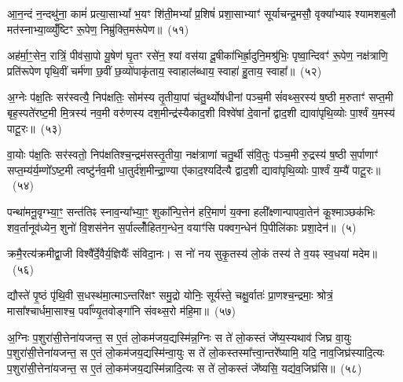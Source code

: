 आ॒न॒न्दं न॒न्दथु॑ना॒ कामं॑ प्रत्या॒सा\-भ्यां᳚ भ॒यꣳ शि॑ती॒म\-भ्यां᳚ प्र॒शिषं॑ प्रशा॒साभ्याꣳ॑ सूर्याचन्द्र॒मसौ॒ वृक्या᳚भ्याꣴ श्यामशब॒लौ मत॑स्नाभ्या॒व्व्युँ॑ष्टिꣳ रू॒पेण॒ निम्रु॑क्ति॒मरू॑पेण॥~(५१)

{\anuvakamend[{आ॒न॒न्दꣳ षोड॑श}]}%

अह॑र्मा॒ꣳ॒सेन॒ रात्रिं॒ पीव॑सा॒पो यू॒षेण॑ घृ॒तꣳ रसे॑न॒ श्यां वस॑या दू॒षीका॑भिर्\mbox{}ह्रा॒दुनि॒मश्रु॑भिः॒ पृष्वा॒न्दिवꣳ॑ रू॒पेण॒ नक्ष॑त्राणि॒ प्रति॑रूपेण पृथि॒वीं चर्म॑णा छ॒वीं छ॒व्यो॑पाकृ॑ताय॒ स्वाहाल॑ब्धाय॒ स्वाहा॑ हु॒ताय॒ स्वाहा᳚॥~(५२)

{\anuvakamend[{अह॑र॒ष्टाविꣳ॑शतिः}]}%

अ॒ग्नेः प॑क्ष॒तिः सर॑स्वत्यै॒ निप॑क्षतिः॒ सोम॑स्य तृ॒तीया॒पां च॑तु॒र्थ्योष॑धीनां पञ्च॒मी सं॑वथ्स॒रस्य॑ ष॒ष्ठी म॒रुताꣳ॑ सप्त॒मी बृह॒स्पते॑रष्ट॒मी मि॒त्रस्य॑ नव॒मी वरु॑णस्य दश॒मीन्द्र॑स्यैकाद॒शी विश्वे॑षां दे॒वानां᳚ द्वाद॒शी द्यावा॑पृथि॒व्योः पा॒र्श्वं य॒मस्य॑ पाटू॒रः॥~(५३)

{\anuvakamend[{अ॒ग्नेरेका॒न्नत्रि॒ꣳ॒शत्}]}%

वा॒योः प॑क्ष॒तिः सर॑स्वतो॒ निप॑क्षतिश्च॒न्द्रम॑सस्तृ॒तीया॒ नक्ष॑त्राणां चतु॒र्थी स॑वि॒तुः प॑ञ्च॒मी रु॒द्रस्य॑ ष॒ष्ठी स॒र्पाणाꣳ॑ सप्त॒म्य॑र्य॒म्णो᳚\-ऽष्ट॒मी त्वष्टु॑र्नव॒मी धा॒तुर्द॑श॒मीन्द्रा॒ण्या ए॑काद॒श्यदि॑त्यै द्वाद॒शी द्यावा॑पृथि॒व्योः पा॒र्श्वं य॒म्यै॑ पाटू॒रः॥~(५४)

{\anuvakamend[{वा॒योर॒ष्टाविꣳ॑शतिः}]}%

पन्था॑मनू॒वृग्भ्या॒ꣳ॒ सन्त॑तिꣴ स्नाव॒न्या᳚भ्या॒ꣳ॒ शुका᳚न्पि॒त्तेन॑ हरि॒माणं॑ य॒क्ना हली᳚क्ष्णान्पापवा॒तेन॑ कू॒श्माञ्छक॑भिः शव॒र्तानूव॑ध्येन॒ शुनो॑ वि॒शस॑नेन स॒र्पाल्लोँ॑हितग॒न्धेन॒ वयाꣳ॑सि पक्वग॒न्धेन॑ पि॒पीलि॑काः प्रशा॒देन॑॥~(५)

{\anuvakamend[{पन्था॒न्द्वाविꣳ॑शतिः}]}%

क्रमै॒रत्य॑क्रमीद्वा॒जी विश्वै᳚र्दे॒वैर्य॒ज्ञियैः᳚ संविदा॒नः। स नो॑ नय सुकृ॒तस्य॑ लो॒कं तस्य॑ ते व॒यꣴ स्व॒धया॑ मदेम॥~(५६)

{\anuvakamend[{क्रमै॑र॒ष्टाद॑श}]}%

द्यौस्ते॑ पृ॒ष्ठं पृ॑थि॒वी स॒धस्थ॑मा॒त्माऽन्तरि॑क्षꣳ समु॒द्रो योनिः॒ सूर्य॑स्ते॒ चक्षु॒र्वातः॑ प्रा॒णश्च॒न्द्रमाः॒ श्रोत्रं॒ मासा᳚श्चार्धमा॒साश्च॒ पर्वा᳚ण्यृ॒तवोङ्गा॑नि संवथ्स॒रो म॑हि॒मा॥~(५७)

{\anuvakamend[{द्यौः पञ्च॑विꣳशतिः}]}%

अ॒ग्निः प॒शुरा॑सी॒त्तेना॑यजन्त॒ स ए॒तं लो॒कम॑जय॒द्यस्मि॑न्न॒ग्निः स ते॑ लो॒कस्तं जे᳚ष्य॒स्यथाव॑ जिघ्र वा॒युः प॒शुरा॑सी॒त्तेना॑यजन्त॒ स ए॒तं लो॒कम॑जय॒द्यस्मि॑न्वा॒युः स ते॑ लो॒कस्तस्मा᳚त्त्वा॒न्तरे᳚ष्यामि॒ यदि॒ नाव॒जिघ्र॑स्यादि॒त्यः प॒शुरा॑सी॒त्तेना॑यजन्त॒ स ए॒तं लो॒कम॑जय॒द्यस्मि॑न्नादि॒त्यः स ते॑ लो॒कस्तं जे᳚ष्यसि॒ यद्य॑व॒जिघ्र॑सि॥~(५८)

